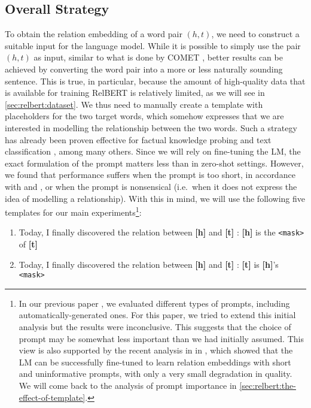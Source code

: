 \documentclass[3p]{elsarticle}
\begin{document}
{\subsection{Overall Strategy} \label{sec:relbert:overall-strategy}
To obtain the relation embedding of a word pair $(h, t)$, we need to construct a suitable input for the language model. While it is possible to simply use the pair $(h,t)$ as input, similar to what is done by COMET \cite{bosselut-etal-2019-comet}, better results can be achieved by converting the word pair into a more or less naturally sounding sentence. This is true, in particular, because the amount of high-quality data that is available for training RelBERT is relatively limited, as we will see in \autoref{sec:relbert:dataset}. We thus need to manually create a template with placeholders for the two target words, which somehow expresses that we are interested in modelling the relationship between the two words. Such a strategy has already been proven effective for factual knowledge probing \cite{petroni-etal-2019-language} and text classification \cite{schick-schutze-2021-exploiting,tam2021improving,le2021many}, among many others. Since we will rely on fine-tuning the LM, the exact formulation of the prompt matters less than in zero-shot settings. However, we found that performance suffers when the prompt is too short, in accordance with \cite{bouraoui2020inducing} and \cite{jiang-etal-2020-know}, or when the prompt is nonsensical (i.e.\ when it does not express the idea of modelling a relationship). With this in mind, we will use the following five templates for our main experiments\footnote{In our previous paper \cite{ushio-etal-2021-distilling}, we evaluated different types of prompts, including automatically-generated ones. For this paper, we tried to extend this initial analysis but the results were inconclusive. This suggests that the choice of prompt may be somewhat less important than we had initially assumed. This view is also supported by the recent analysis in in \cite{pitarch-etal-2023-clues}, which showed that the LM can be successfully fine-tuned to learn relation embeddings with short and uninformative prompts, with only a very small degradation in quality. We will come back to the analysis of prompt importance in \autoref{sec:relbert:the-effect-of-template}.}:
\begin{enumerate}
    \item  Today, I finally discovered the relation between \textbf{[h]} and \textbf{[t]} : \textbf{[h]} is the \texttt{<mask>} of \textbf{[t]}
    \item Today, I finally discovered the relation between \textbf{[h]} and \textbf{[t]} : \textbf{[t]} is \textbf{[h]}'s \texttt{<mask>}

\end{enumerate}}
\end{document}
